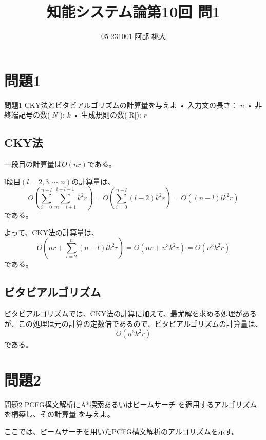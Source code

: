 \documentclass[a4paper,11pt]{ltjsarticle}
\begin{document}
\title{知能システム論第10回 問1}
\author{ 05-231001 阿部 桃大}
\maketitle

\section*{問題1}
\begin{itembox}[l]{問題1}
  CKY法とビタビアルゴリズムの計算量を与えよ\newline
  • ⼊⼒⽂の⻑さ： $n$\newline
  • ⾮終端記号の数($|N|$): $k$\newline
  • ⽣成規則の数(|R|): $r$
\end{itembox}
\subsection*{CKY法}
一段目の計算量は$O(nr)$である。

l段目$(l=2,3,\cdots,n)$の計算量は、
\begin{equation*}
  O\left(\sum_{i=0}^{n-l}\sum_{m=i+1}^{i+l-1}k^2 r\right)=O\left(\sum_{i=0}^{n-l} (l-2)k^2 r\right)=O((n-l)lk^2 r)
\end{equation*}
である。

よって、CKY法の計算量は、
\begin{equation*}
  O(nr+\sum_{l=2}^n (n-l)lk^2r)=O(nr+n^3k^2r)=O(n^3k^2r)
\end{equation*}
である。

\subsection*{ビタビアルゴリズム}
ビタビアルゴリズムでは、CKY法の計算に加えて、最尤解を求める処理があるが、この処理は元の計算の定数倍であるので、ビタビアルゴリズムの計算量は、
\begin{equation*}
  O(n^3k^2r)
\end{equation*}
である。

\section*{問題2}
\begin{itembox}[l]{問題2}
  PCFG構⽂解析にA*探索あるいはビームサーチ
  を適⽤するアルゴリズムを構築し、その計算量
  を与えよ。
\end{itembox}
ここでは、ビームサーチを用いたPCFG構文解析のアルゴリズムを示す。
\end{document}
